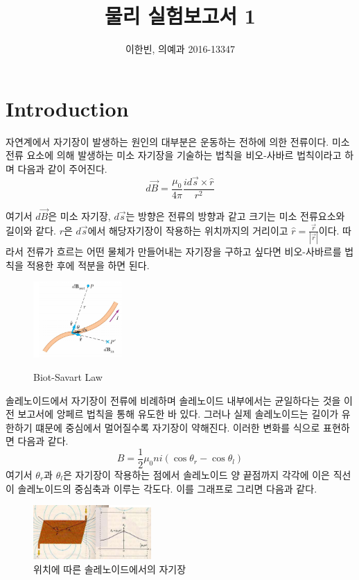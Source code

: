 \documentclass[a4paper]{article}
\title{물리 실험보고서 1}
\author{이한빈, 의예과 2016-13347}
\begin{document}
\maketitle

\section{Introduction}
	자연계에서 자기장이 발생하는 원인의 대부분은 운동하는 전하에 의한 전류이다.
	미소 전류 요소에 의해 발생하는 미소 자기장을 기술하는 법칙을 비오-사바르 법칙이라고 하며 다음과 같이 주어진다.
	\begin{equation}
		d\vec{B} = \frac{\mu_{0}}{4\pi} \frac{id\vec{s} \times \hat{r}}{r^2}
		\label{eq:biot}
	\end{equation}

	여기서 $d\vec{B}$은 미소 자기장, $d\vec{s}$는 방향은 전류의 방향과 같고 크기는 미소 전류요소와 길이와 같다.
	$r$은 $d\vec{s}$에서 해당자기장이 작용하는 위치까지의 거리이고 $\hat{r} = \frac{\vec{r}}{|\vec{r}|}$이다.
	따라서 전류가 흐르는 어떤 물체가 만들어내는 자기장을 구하고 싶다면 비오-사바르를 법칙을 적용한 후에 적분을 하면 된다. 
	\begin{figure}[h]
		\centering
		\includegraphics[width=0.3\textwidth]{img/biot.png}
		\label{fig:biot} 
		\caption{Biot-Savart Law}
	\end{figure}

	솔레노이드에서 자기장이 전류에 비례하며 솔레노이드 내부에서는 균일하다는 것을 이전 보고서에 앙페르 법칙을 통해 유도한 바 있다.
	그러나 실제 솔레노이드는 길이가 유한하기 떄문에 중심에서 멀어질수록 자기장이 약해진다.
	이러한 변화를 식으로 표현하면 다음과 같다.
	\begin{equation}
		B = \frac{1}{2} \mu_{0} n i (\cos{\theta{}_{r}} - \cos{\theta{}_{l}})
		\label{eq:soldiff}
	\end{equation}
	여기서 $\theta_{r}$과 $\theta_{l}$은 자기장이 작용하는 점에서 솔레노이드 양 끝점까지 각각에 이은 직선이 솔레노이드의 중심축과 이루는 각도다. 이를 그래프로 그리면 다음과 같다.
	
	\begin{figure}[h]
		\centering
		\includegraphics[width=0.4\textwidth]{img/soldiff.png}
		\caption{위치에 따른 솔레노이드에서의 자기장}
	\end{figure}
\end{document}
